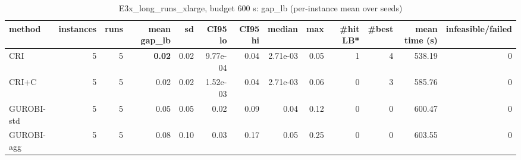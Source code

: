 \begin{table}[htbp]
\centering
\small
\caption{E3x\_long\_runs\_xlarge, budget 600 s: gap\_lb (per-instance mean over seeds)}
\label{tab:E3x_long_runs_xlarge_b600_summary}
\begin{tabular}{lrrrrrrrrrrrr}
\toprule
method & instances & runs & mean gap\_lb & sd & CI95 lo & CI95 hi & median & max & \#hit LB* & \#best & mean time (s) & infeasible/failed \\
\midrule
CRI & 5 & 5 & \textbf{0.02} & 0.02 & 9.77e-04 & 0.04 & 2.71e-03 & 0.05 & 1 & 4 & 538.19 & 0 \\
CRI+C & 5 & 5 & 0.02 & 0.02 & 1.52e-03 & 0.04 & 2.71e-03 & 0.06 & 0 & 3 & 585.76 & 0 \\
GUROBI-std & 5 & 5 & 0.05 & 0.05 & 0.02 & 0.09 & 0.04 & 0.12 & 0 & 0 & 600.47 & 0 \\
GUROBI-agg & 5 & 5 & 0.08 & 0.10 & 0.03 & 0.17 & 0.05 & 0.25 & 0 & 0 & 603.55 & 0 \\
\bottomrule
\end{tabular}
\end{table}

